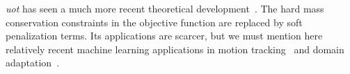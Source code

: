 \emph{\Gls{uot}} has seen a much more recent theoretical development~\cite{chizat2018unbalanced,chizat-these}. The hard mass conservation constraints in the objective function are replaced by soft penalization terms. Its applications are scarcer, but we must mention here relatively recent machine learning applications in motion tracking~\cite{9152115} and domain adaptation~\cite{fatras2021unbalanced}.
